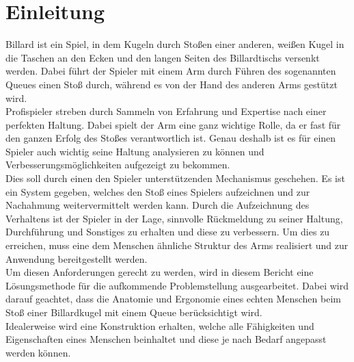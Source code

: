 \chapter{Einleitung}
	
	Billard ist ein Spiel, in dem Kugeln durch Stoßen einer anderen, weißen Kugel in die Taschen an den Ecken und den langen Seiten des Billardtischs versenkt werden. Dabei führt der Spieler mit einem Arm durch Führen des sogenannten Queues einen Stoß durch, während es von der Hand des anderen Arms gestützt wird.\\
	Profispieler streben durch Sammeln von Erfahrung und Expertise nach einer perfekten Haltung. Dabei spielt der Arm eine ganz wichtige Rolle, da er fast für den ganzen Erfolg des Stoßes verantwortlich ist. Genau deshalb ist es für einen Spieler auch wichtig seine Haltung analysieren zu können und Verbesserungsmöglichkeiten aufgezeigt zu bekommen.\\
	Dies soll durch einen den Spieler unterstützenden Mechanismus geschehen. Es ist ein System gegeben, welches den Stoß eines Spielers aufzeichnen und zur Nachahmung weitervermittelt werden kann. Durch die Aufzeichnung des Verhaltens ist der Spieler in der Lage, sinnvolle Rückmeldung zu seiner Haltung, Durchführung und Sonstiges zu erhalten und diese zu verbessern. Um dies zu erreichen, muss eine dem Menschen ähnliche Struktur des Arms realisiert und zur Anwendung bereitgestellt werden.\\
	Um diesen Anforderungen gerecht zu werden, wird in diesem Bericht eine Lösungsmethode für die aufkommende Problemstellung ausgearbeitet. Dabei wird darauf geachtet, dass die Anatomie und Ergonomie eines echten Menschen beim Stoß einer Billardkugel mit einem Queue berücksichtigt wird.\\
	Idealerweise wird eine Konstruktion erhalten, welche alle Fähigkeiten und Eigenschaften eines Menschen beinhaltet und diese je nach Bedarf angepasst werden können.
